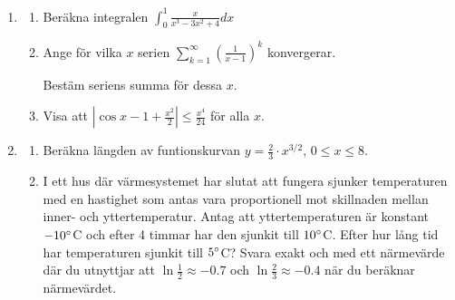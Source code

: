\documentclass[11pt]{article}
\begin{document}
\begin{enumerate}
    \item
        \begin{enumerate}
            \item Beräkna integralen
                  $\displaystyle \int_0^1\frac{x}{x^3 - 3x^2 + 4} dx$

              \item Ange för vilka $x$ serien
                    $\displaystyle \sum_{k = 1}^{\infty}\left(\frac{1}{x - 1}\right)^k$
                    konvergerar.

                    Bestäm seriens summa för dessa $x$.

              \item Visa att $\displaystyle |\cos x - 1 + \frac{x^2}{2}| \leq \frac{x^4}{24}$
                    för alla $x$.
        \end{enumerate}

    \item
        \begin{enumerate}
            \item Beräkna längden av funtionskurvan
                  $\displaystyle y = \frac{2}{3} \cdot x^{3/2}$, $0 \leq x \leq 8$.

              \item I ett hus där värmesystemet har slutat att fungera sjunker
                    temperaturen med en hastighet som antas vara proportionell
                    mot skillnaden mellan inner- och yttertemperatur. Antag att
                    yttertemperaturen är konstant $-10\degree$C och efter 4
                    timmar har den sjunkit till $10\degree$C. Efter hur lång tid
                    har temperaturen sjunkit till $5\degree$C? Svara exakt och
                    med ett närmevärde där du utnyttjar att
                    $\ln \frac{1}{2} \approx -0.7$ och
                    $\ln \frac{2}{3} \approx -0.4$ när du beräknar närmevärdet.
        \end{enumerate}
\end{enumerate}
\end{document}
